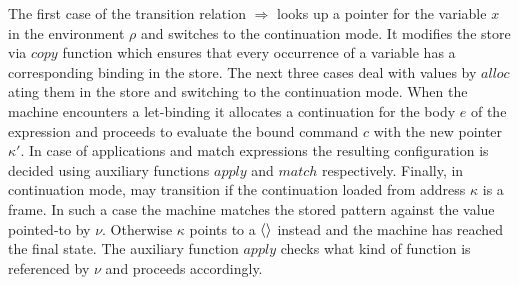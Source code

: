The first case of the transition relation $\Rightarrow$ looks up a pointer for the variable $x$ in the environment $\rho$ and switches to the continuation mode.
It modifies the store via $\mathit{copy}$ function which ensures that every occurrence of a variable has a corresponding binding in the store.
The next three cases deal with values by $\mathit{alloc}$ating them in the store and switching to the continuation mode.
When the machine encounters a let-binding it allocates a continuation for the body $e$ of the expression and proceeds to evaluate the bound command $c$ with the new pointer $\kappa'$.
In case of applications and match expressions the resulting configuration is decided using auxiliary functions $\mathit{apply}$ and $\mathit{match}$ respectively.
Finally, in continuation mode, may transition if the continuation loaded from address $\kappa$ is a frame.
In such a case the machine matches the stored pattern against the value pointed-to by $\nu$.
Otherwise $\kappa$ points to a $\left<  \right>$ instead and the machine has reached the final state.
The auxiliary function $\mathit{apply}$ checks what kind of function is referenced by $\nu$ and proceeds accordingly.


